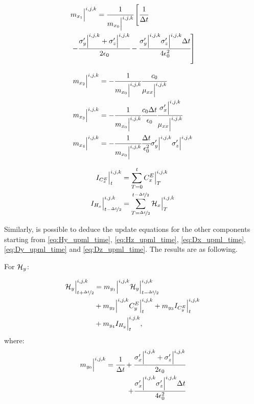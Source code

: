 \begin{align}
    &m_{{x_1}}\Big|^{i,j,k} = \cfrac{1}{m_{{x_0}}\Big|^{i,j,k}}\left[\cfrac{1}{\Delta t} \right. 
    \nonumber \\
    &\left.- \cfrac{\sigma_y^{\prime}\Big|^{i,j,k} + \sigma_z^{\prime}\Big|^{i,j,k}}{2\epsilon_0} - \cfrac{\sigma_y^{\prime}\Big|^{i,j,k}  \sigma_z^{\prime}\Big|^{i,j,k} \Delta t}{4\epsilon_0^2} \right]
\end{align}


\begin{align}
    m_{{x_2}}\Big|^{i,j,k} &= -\cfrac{1}{m_{{x_0}}\Big|^{i,j,k}} \cfrac{c_0}{\mu_{xx}\Big|^{i,j,k}}
    \\
    m_{{x_3}}\Big|^{i,j,k} &= -\cfrac{1}{m_{{x_0}}\Big|^{i,j,k}} \cfrac{c_0\Delta t}{\epsilon_0 }\cfrac{ \sigma_x^{\prime}\Big|^{i,j,k}}{\mu_{xx}\Big|^{i,j,k}}
    \\
    m_{{x_4}}\Big|^{i,j,k} &= -\cfrac{1}{m_{{x_0}}\Big|^{i,j,k}} \cfrac{\Delta t}{\epsilon_0^2} \sigma_y^{\prime}\Big|^{i,j,k}  \sigma_z^{\prime}\Big|^{i,j,k}
\end{align}

\begin{align}
    I_{C^E_x}\Big|^{i,j,k}_t &= \sum\limits_{T=0}^tC_x^E\Big|^{i,j,k}_T
    \\
    I_{H_x}\Big|^{i,j,k}_{t-\nicefrac{\Delta t}{2}} &= \sum\limits_{T=\nicefrac{\Delta t}{2}}^{t-\nicefrac{\Delta t}{2}} \mathcal{H}_x\Big|^{i,j,k}_T
\end{align}

Similarly, is possible to deduce the update equations for the other components starting from \eqref{eq:Hy_upml_time}, \eqref{eq:Hz_upml_time}, \eqref{eq:Dx_upml_time}, \eqref{eq:Dy_upml_time} and \eqref{eq:Dz_upml_time}. The results are as following.

For $\mathcal{H}_y$:

\begin{align}
    \mathcal{H}_y\Big|_{t+\nicefrac{\Delta t}{2}}^{i,j,k} &= m_{{y_1}}\Big|^{i,j,k} \mathcal{H}_y\Big|_{t-\nicefrac{\Delta t}{2}}^{i,j,k} 
    \nonumber \\
    & + m_{{y_2}}\Big|^{i,j,k}C_y^E\Big|^{i,j,k}_{t} + m_{{y_3}} I_{C^E_y}\Big|^{i,j,k}_{t} 
    \nonumber \\
    &+ m_{{y_4}} I_{H_y}\Big|^{i,j,k}_{t},
\end{align}
where:
\begin{align}
    m_{{y_0}}\Big|^{i,j,k} = \cfrac{1}{\Delta t} + \cfrac{\sigma_x^{\prime}\Big|^{i,j,k} + \sigma_z^{\prime}\Big|^{i,j,k}}{2\epsilon_0} \nonumber\\ + \cfrac{\sigma_x^{\prime}\Big|^{i,j,k}  \sigma_z^{\prime}\Big|^{i,j,k} \Delta t}{4\epsilon_0^2}
\end{align}

